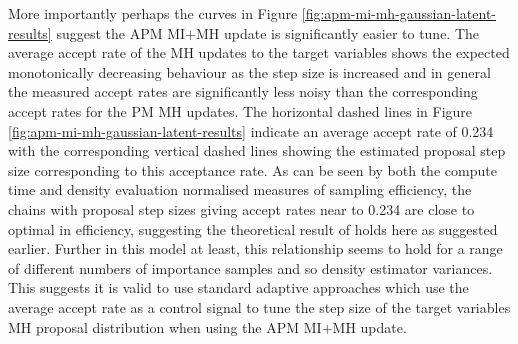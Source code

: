More importantly perhaps the curves in Figure \ref{fig:apm-mi-mh-gaussian-latent-results} suggest the \ac{APM} \ac{MI}+\ac{MH} update is significantly easier to tune. The average accept rate of the \ac{MH} updates to the target variables shows the expected monotonically decreasing behaviour as the step size is increased and in general the measured accept rates are significantly less noisy than the corresponding accept rates for the \ac{PM} \ac{MH} updates. The horizontal dashed lines in Figure \ref{fig:apm-mi-mh-gaussian-latent-results} indicate an average accept rate of 0.234 with the corresponding vertical dashed lines showing the estimated proposal step size corresponding to this acceptance rate. As can be seen by both the compute time and density evaluation normalised measures of sampling efficiency, the chains with proposal step sizes giving accept rates near to 0.234 are close to optimal in efficiency, suggesting the theoretical result of \citep{gelman1997weak} holds here as suggested earlier. Further in this model at least, this relationship seems to hold for a range of different numbers of importance samples and so density estimator variances. This suggests it is valid to use standard adaptive approaches which use the average accept rate as a control signal to tune the step size of the target variables \ac{MH} proposal distribution when using the \ac{APM} \ac{MI}+\ac{MH} update.

